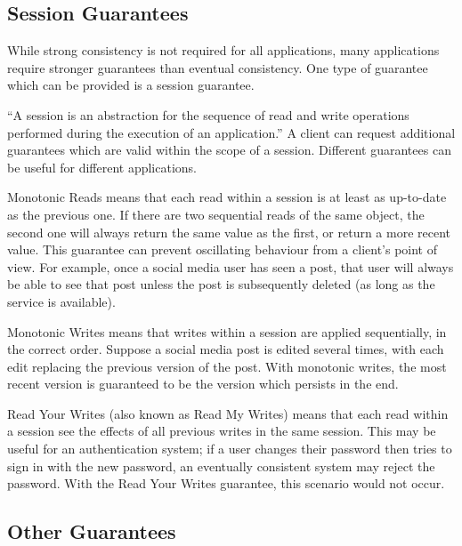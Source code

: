 \documentclass[12pt,a4paper,twoside,openany]{report}
\begin{document}
\subsection*{Session Guarantees}

While strong consistency is not required for all applications, many applications require stronger guarantees than eventual consistency. One type of guarantee which can be provided is a session guarantee.

``A session is an abstraction for the sequence of read and write operations performed during the execution of an application.'' \cite{terry1994} A client can request additional guarantees which are valid within the scope of a session. Different guarantees can be useful for different applications.

\begin{description}
\item{Monotonic Reads} means that each read within a session is at least as up-to-date as the previous one. If there are two sequential reads of the same object, the second one will always return the same value as the first, or return a more recent value. This guarantee can prevent oscillating behaviour from a client's point of view. For example, once a social media user has seen a post, that user will always be able to see that post unless the post is subsequently deleted (as long as the service is available).

\item{Monotonic Writes} means that writes within a session are applied sequentially, in the correct order. Suppose a social media post is edited several times, with each edit replacing the previous version of the post. With monotonic writes, the most recent version is guaranteed to be the version which persists in the end.

\item{Read Your Writes} (also known as Read My Writes) means that each read within a session see the effects of all previous writes in the same session. This may be useful for an authentication system; if a user changes their password then tries to sign in with the new password, an eventually consistent system may reject the password. With the Read Your Writes guarantee, this scenario would not occur.

\end{description}

\subsection*{Other Guarantees}
\end{document}
